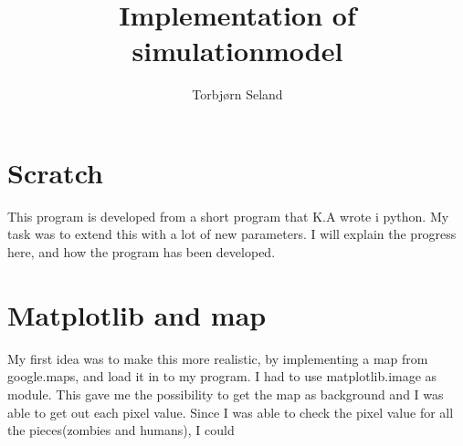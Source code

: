 \documentclass[11pt]{article}
\title{\textbf{Implementation of \\simulationmodel}}
\author{Torbjørn Seland}
\date{}
\begin{document}
\maketitle

\section{Scratch}
This program is developed from a short program that K.A wrote i python. My task was to
extend this with a lot of new parameters. I will explain the progress here, and how the program has been 
developed.

\section{Matplotlib and map}
My first idea was to make this more realistic, by implementing a map from google.maps, and load it in
to my program. I had to use matplotlib.image as module. This gave me the possibility to get the map as background and I was able to get out each pixel value. Since I was able to check the pixel value for all the pieces(zombies and humans), I could  
\end{document}
